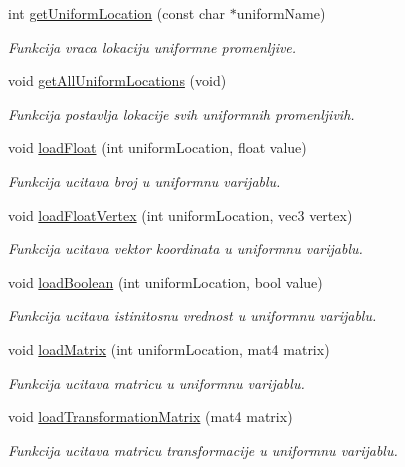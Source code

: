 \begin{DoxyCompactItemize}
int \hyperlink{classshader_1_1HudShader_af9ed170816ba27a227dd8ce7c6e0aba4}{get\+Uniform\+Location} (const char $\ast$uniform\+Name)
\begin{DoxyCompactList}\small\item\em Funkcija vraca lokaciju uniformne promenljive. \end{DoxyCompactList}\item 
void \hyperlink{classshader_1_1HudShader_a881374d89ec7a37d5e73c8694ab42d09}{get\+All\+Uniform\+Locations} (void)
\begin{DoxyCompactList}\small\item\em Funkcija postavlja lokacije svih uniformnih promenljivih. \end{DoxyCompactList}\item 
void \hyperlink{classshader_1_1HudShader_ac184470cfd0979bc13fc7571d9e0b310}{load\+Float} (int uniform\+Location, float value)
\begin{DoxyCompactList}\small\item\em Funkcija ucitava broj u uniformnu varijablu. \end{DoxyCompactList}\item 
void \hyperlink{classshader_1_1HudShader_a5bfee0570129124b25d570310b18c5e5}{load\+Float\+Vertex} (int uniform\+Location, vec3 vertex)
\begin{DoxyCompactList}\small\item\em Funkcija ucitava vektor koordinata u uniformnu varijablu. \end{DoxyCompactList}\item 
void \hyperlink{classshader_1_1HudShader_a6e043863cf72ace1afe77e8fbe101b59}{load\+Boolean} (int uniform\+Location, bool value)
\begin{DoxyCompactList}\small\item\em Funkcija ucitava istinitosnu vrednost u uniformnu varijablu. \end{DoxyCompactList}\item 
void \hyperlink{classshader_1_1HudShader_a373b1c7ffde706843e2b45b7b48af3ef}{load\+Matrix} (int uniform\+Location, mat4 matrix)
\begin{DoxyCompactList}\small\item\em Funkcija ucitava matricu u uniformnu varijablu. \end{DoxyCompactList}\item 
void \hyperlink{classshader_1_1HudShader_a000e6fafa088f6fdd9f9554da408431e}{load\+Transformation\+Matrix} (mat4 matrix)
\begin{DoxyCompactList}\small\item\em Funkcija ucitava matricu transformacije u uniformnu varijablu. \end{DoxyCompactList}\end{DoxyCompactItemize}
